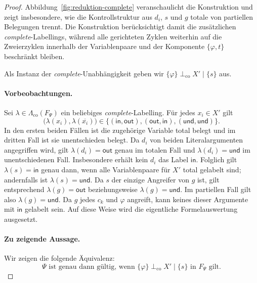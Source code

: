 \begin{proof}
    Abbildung~\ref{fig:reduktion-complete} veranschaulicht die Konstruktion
    und zeigt insbesondere, wie die Kontrollstruktur aus \(d_i\), \(s\) und
    \(g\) totale von partiellen Belegungen trennt. Die Konstruktion
    berücksichtigt damit die zusätzlichen \emph{complete}-Labellings, während
    alle gerichteten Zyklen weiterhin auf die Zweierzyklen innerhalb der
    Variablenpaare und der Komponente \(\{\varphi,t\}\) beschränkt bleiben.

    Als Instanz der \emph{complete}-Unabhängigkeit geben wir
    \(
        \{\varphi\}
        \perp_{\mathrm{co}}
        X'
        \mid
        \{s\}
    \)
    aus.

    \paragraph{Vorbeobachtungen.}
    Sei \(\lambda\in\Lambda_{\mathrm{co}}(F_{\Psi})\) ein beliebiges
    \emph{complete}-Labelling. Für jedes \(x_i\in X'\) gilt
    \[
        \bigl(\lambda(x_i),\lambda(\overline{x_i})\bigr)
        \in
        \{(\mathsf{in},\mathsf{out}),
          (\mathsf{out},\mathsf{in}),
          (\mathsf{und},\mathsf{und})\}.
    \]
    In den ersten beiden Fällen ist die zugehörige Variable total
    belegt und im dritten Fall ist sie unentschieden belegt. Da \(d_i\) von beiden
    Literalargumenten angegriffen wird, gilt \(\lambda(d_i)=\mathsf{out}\) genau
    im totalen Fall und \(\lambda(d_i)=\mathsf{und}\) im unentschiedenen Fall.
    Insbesondere erhält kein \(d_i\) das Label \(\mathsf{in}\). Folglich gilt
    \(\lambda(s)=\mathsf{in}\) genau dann, wenn alle Variablenpaare für \(X'\)
    total gelabelt sind; andernfalls ist \(\lambda(s)=\mathsf{und}\). Da \(s\)
    der einzige Angreifer von \(g\) ist, gilt entsprechend
    \(\lambda(g)=\mathsf{out}\) beziehungsweise \(\lambda(g)=\mathsf{und}\). Im
    partiellen Fall gilt also \(\lambda(g)=\mathsf{und}\). Da \(g\) jedes
    \(c_k\) und \(\varphi\) angreift, kann keines dieser Argumente mit
    \(\mathsf{in}\) gelabelt sein. Auf diese Weise wird die eigentliche
    Formelauswertung ausgesetzt.

    \paragraph{Zu zeigende Aussage.}
    Wir zeigen die folgende Äquivalenz:
    \begin{equation}
        \Psi\text{ ist genau dann gültig, wenn }
        \{\varphi\}\perp_{\mathrm{co}}X'\mid\{s\}
        \text{ in }F_{\Psi}\text{ gilt.}
        \tag{$*$}
    \end{equation}


\end{proof}
